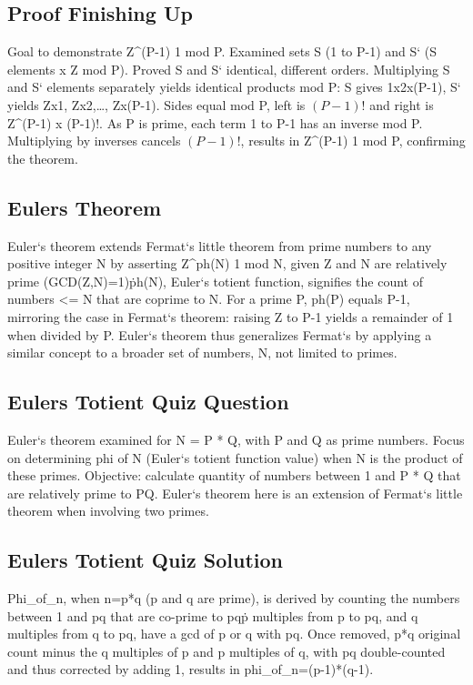\subsection*{Proof  Finishing Up}
Goal to demonstrate Z\textasciicircum{}(P-1)  1 mod P\@.
Examined sets S (1 to P-1) and S` (S elements x Z mod P).
Proved S and S` identical, different orders.
Multiplying S and S` elements separately yields identical products mod P: S gives 1x2x\ldotsx(P-1), S` yields Zx1, Zx2,\ldots, Zx(P-1).
Sides equal mod P, left is $(P-1)!$ and right is Z\textasciicircum{}(P-1) x (P-1)!.
As P is prime, each term 1 to P-1 has an inverse mod P\@.
Multiplying by inverses cancels $(P-1)!$, results in Z\textasciicircum{}(P-1)  1 mod P, confirming the theorem.

\subsection*{Eulers Theorem}
Euler`s theorem extends Fermat`s little theorem from prime numbers to any positive integer N by asserting Z\textasciicircum{}ph(N)  1 mod N, given Z and N are relatively prime (GCD(Z,N)=1)\. ph(N), Euler`s totient function, signifies the count of numbers \textless{}= N that are coprime to N\@.
For a prime P, ph(P) equals P-1, mirroring the case in Fermat`s theorem: raising Z to P-1 yields a remainder of 1 when divided by P\@.
Euler`s theorem thus generalizes Fermat`s by applying a similar concept to a broader set of numbers, N, not limited to primes.

\subsection*{Eulers Totient Quiz Question}
Euler`s theorem examined for N = P * Q, with P and Q as prime numbers.
Focus on determining phi of N (Euler`s totient function value) when N is the product of these primes.
Objective: calculate quantity of numbers between 1 and P * Q that are relatively prime to PQ\@.
Euler`s theorem here is an extension of Fermat`s little theorem when involving two primes.

\subsection*{Eulers Totient Quiz Solution}
Phi\_of\_n, when n=p*q (p and q are prime), is derived by counting the numbers between 1 and pq that are co-prime to pq\. p multiples from p to pq, and q multiples from q to pq, have a gcd of p or q with pq.
Once removed, p*q original count minus the q multiples of p and p multiples of q, with pq double-counted and thus corrected by adding 1, results in phi\_of\_n=(p-1)*(q-1).

